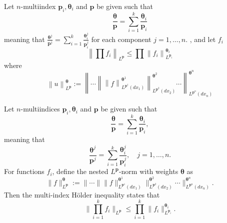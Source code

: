 \begin{definition}
    Let $n$-multiindex $\mathbf{p}_i,\boldsymbol{\theta}_i$ and $\mathbf{p}$ be given such that
    \begin{equation*}
        \frac{\boldsymbol{\theta}}{\mathbf{p}}
        =
        \sum_{i=1}^k
        \frac{\boldsymbol{\theta}_i}{\mathbf{p}_i}
    \end{equation*}
    meaning that
    $\frac{\boldsymbol{\theta}^j}{\mathbf{p}^j}
        =
        \sum_{i=1}^k \frac{\boldsymbol{\theta}_i^j}{\mathbf{p}_i^j}$
    for each component $j=1,\ldots,n$.
    , and let $f_i$
    \begin{equation*}
        \left\|\prod f_i\right\|_{L^{\mathbf{p}}}
        \leq
        \prod \left\|f_i\right\|_{L^{\mathbf{p}_i}}^{\boldsymbol{\theta}_i}
    \end{equation*}
    where
    \begin{equation*}
        \left\|u\right\|_{L^{\mathbf{p}}}^{\boldsymbol{\theta}}
        :=
        \left\|\cdots\left\|\left\|f\right\|_{L^{\mathbf{p}^1}\left(dx_1\right)}^{\boldsymbol{\theta}^1}\right\|_{L^{\mathbf{p}^2}\left(dx_2\right)}^{\boldsymbol{\theta}^2}\cdots \right\|_{L^{\mathbf{p}^n}\left(dx_n\right)}^{\boldsymbol{\theta}^n}
    \end{equation*}
\end{definition}

\begin{definition}
    Let $n$-multiindices $\mathbf{p}_i, \boldsymbol{\theta}_i$ and $\mathbf{p}$ be given such that
    \begin{equation*}
        \frac{\boldsymbol{\theta}}{\mathbf{p}}
        =
        \sum_{i=1}^k
        \frac{\boldsymbol{\theta}_i}{\mathbf{p}_i},
    \end{equation*}
    meaning that
    \[
        \frac{\boldsymbol{\theta}^j}{\mathbf{p}^j}
        =
        \sum_{i=1}^k \frac{\boldsymbol{\theta}_i^j}{\mathbf{p}_i^j}, \quad j=1,\ldots,n.
    \]
    For functions $f_i$, define the nested $L^{\mathbf{p}}$-norm with weights $\boldsymbol{\theta}$ as
    \begin{equation*}
        \| f \|_{L^{\mathbf{p}}}^{\boldsymbol{\theta}}
        :=
        \Big\| \cdots \Big\| \big\| f \big\|_{L^{\mathbf{p}^1}(dx_1)}^{\boldsymbol{\theta}^1} \Big\|_{L^{\mathbf{p}^2}(dx_2)}^{\boldsymbol{\theta}^2} \cdots \Big\|_{L^{\mathbf{p}^n}(dx_n)}^{\boldsymbol{\theta}^n}.
    \end{equation*}
    Then the multi-index Hölder inequality states that
    \begin{equation*}
        \Big\| \prod_{i=1}^k f_i \Big\|_{L^{\mathbf{p}}}
        \le
        \prod_{i=1}^k \| f_i \|_{L^{\mathbf{p}_i}}^{\boldsymbol{\theta}_i}.
    \end{equation*}
\end{definition}

